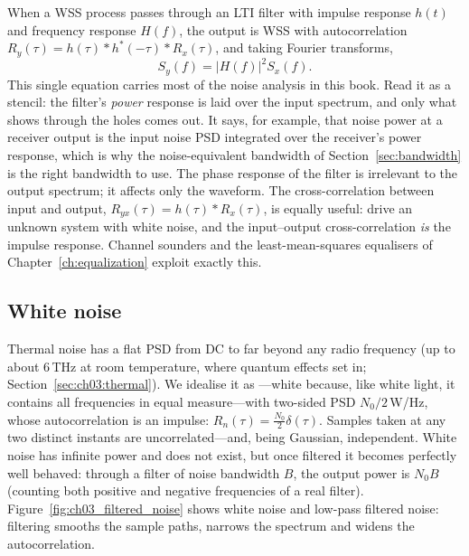 When a WSS process passes through an LTI filter with impulse response $h(t)$ and frequency response
$H(f)$, the output is WSS with autocorrelation $R_y(\tau)=h(\tau)*h^*(-\tau)*R_x(\tau)$, and taking
Fourier transforms,
\begin{equation}
S_y(f)=|H(f)|^2S_x(f).
\label{eq:ch03:filtpsd}
\end{equation}
This single equation carries most of the noise analysis in this book. Read it as a stencil: the
filter's \emph{power} response is laid over the input spectrum, and only what shows through the
holes comes out. It says, for example, that noise power at a receiver output is the input noise PSD
integrated over the receiver's power response, which is why the noise-equivalent bandwidth of
Section~\ref{sec:bandwidth} is the right bandwidth to use. The phase response of the filter is
irrelevant to the output spectrum; it affects only the waveform. The cross-correlation between input
and output, $R_{yx}(\tau)=h(\tau)*R_x(\tau)$, is equally useful: drive an unknown system with white
noise, and the input--output cross-correlation \emph{is} the impulse response. Channel sounders and
the least-mean-squares equalisers of Chapter~\ref{ch:equalization} exploit exactly this.

\subsection{White noise}

Thermal noise has a flat PSD from DC to far beyond any radio frequency (up to about 6\,THz at room
temperature, where quantum effects set in; Section~\ref{sec:ch03:thermal}). We idealise it as
---white because, like white light, it contains all frequencies in equal
measure---with two-sided PSD $N_0/2$\,W/Hz, whose autocorrelation is an impulse:
$R_n(\tau)=\frac{N_0}{2}\delta(\tau)$. Samples taken at any two distinct instants are
uncorrelated---and, being Gaussian, independent. White noise has infinite power and does not exist,
but once filtered it becomes perfectly well behaved: through a filter of noise bandwidth $B$, the
output power is $N_0B$ (counting both positive and negative frequencies of a real filter).
Figure~\ref{fig:ch03_filtered_noise} shows white noise and low-pass filtered noise: filtering smooths
the sample paths, narrows the spectrum and widens the autocorrelation.


